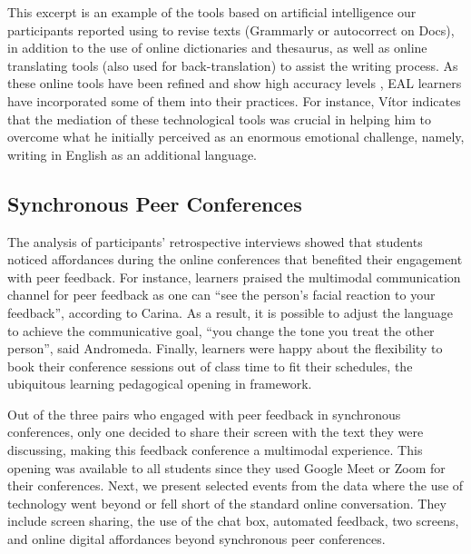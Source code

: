 \documentclass[english]{textolivre}
\begin{document}
This excerpt is an example of the tools based on artificial intelligence our participants reported using to revise texts (Grammarly or autocorrect on Docs), in addition to the use of online dictionaries and thesaurus, as well as online translating tools (also used for back-translation) to assist the writing process. As these online tools have been refined and show high accuracy levels \cite{ranalli2021l2}, EAL learners have incorporated some of them into their practices. For instance, Vítor indicates that the mediation of these technological tools was crucial in helping him to overcome what he initially perceived as an enormous emotional challenge, namely, writing in English as an additional language.


\subsection{Synchronous Peer Conferences}

The analysis of participants’ retrospective interviews showed that students noticed affordances during the online conferences that benefited their engagement with peer feedback. For instance, learners praised the multimodal communication channel for peer feedback as one can “see the person’s facial reaction to your feedback”, according to Carina. As a result, it is possible to adjust the language to achieve the communicative goal, “you change the tone you treat the other person”, said Andromeda. Finally, learners were happy about the flexibility to book their conference sessions out of class time to fit their schedules, the ubiquitous learning pedagogical opening in \textcite{cope2013towards} framework.

Out of the three pairs who engaged with peer feedback in synchronous conferences, only one decided to share their screen with the text they were discussing, making this feedback conference a multimodal experience. This opening was available to all students since they used Google Meet or Zoom for their conferences. Next, we present selected events from the data where the use of technology went beyond or fell short of the standard online conversation. They include screen sharing, the use of the chat box, automated feedback, two screens, and online digital affordances beyond synchronous peer conferences.
\end{document}
